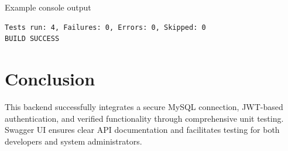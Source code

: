 \documentclass[12pt,a4paper]{article}
\begin{document}
Example console output
\begin{verbatim}
Tests run: 4, Failures: 0, Errors: 0, Skipped: 0
BUILD SUCCESS
\end{verbatim}


\section{Conclusion}
This backend successfully integrates a secure MySQL connection, JWT-based authentication, and verified functionality through comprehensive unit testing. Swagger UI ensures clear API documentation and facilitates testing for both developers and system administrators.
\end{document}
